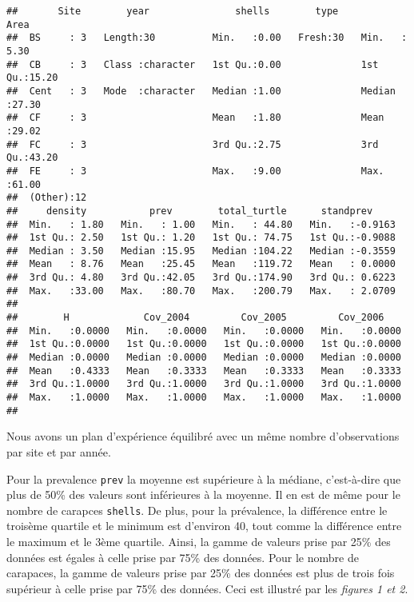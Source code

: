 \documentclass[
]{article}
\begin{document}
\begin{verbatim}
##       Site        year               shells        type         Area      
##  BS     : 3   Length:30          Min.   :0.00   Fresh:30   Min.   : 5.30  
##  CB     : 3   Class :character   1st Qu.:0.00              1st Qu.:15.20  
##  Cent   : 3   Mode  :character   Median :1.00              Median :27.30  
##  CF     : 3                      Mean   :1.80              Mean   :29.02  
##  FC     : 3                      3rd Qu.:2.75              3rd Qu.:43.20  
##  FE     : 3                      Max.   :9.00              Max.   :61.00  
##  (Other):12                                                               
##     density           prev        total_turtle      standprev      
##  Min.   : 1.80   Min.   : 1.00   Min.   : 44.80   Min.   :-0.9163  
##  1st Qu.: 2.50   1st Qu.: 1.20   1st Qu.: 74.75   1st Qu.:-0.9088  
##  Median : 3.50   Median :15.95   Median :104.22   Median :-0.3559  
##  Mean   : 8.76   Mean   :25.45   Mean   :119.72   Mean   : 0.0000  
##  3rd Qu.: 4.80   3rd Qu.:42.05   3rd Qu.:174.90   3rd Qu.: 0.6223  
##  Max.   :33.00   Max.   :80.70   Max.   :200.79   Max.   : 2.0709  
##                                                                    
##        H             Cov_2004         Cov_2005         Cov_2006     
##  Min.   :0.0000   Min.   :0.0000   Min.   :0.0000   Min.   :0.0000  
##  1st Qu.:0.0000   1st Qu.:0.0000   1st Qu.:0.0000   1st Qu.:0.0000  
##  Median :0.0000   Median :0.0000   Median :0.0000   Median :0.0000  
##  Mean   :0.4333   Mean   :0.3333   Mean   :0.3333   Mean   :0.3333  
##  3rd Qu.:1.0000   3rd Qu.:1.0000   3rd Qu.:1.0000   3rd Qu.:1.0000  
##  Max.   :1.0000   Max.   :1.0000   Max.   :1.0000   Max.   :1.0000  
## 
\end{verbatim}

Nous avons un plan d'expérience équilibré avec un même nombre
d'observations par site et par année.\newline 

Pour la prevalence \texttt{prev} la moyenne est supérieure à la médiane,
c'est-à-dire que plus de 50\% des valeurs sont inférieures à la moyenne.
Il en est de même pour le nombre de carapces \texttt{shells}. De plus,
pour la prévalence, la différence entre le troisème quartile et le
minimum est d'environ 40, tout comme la différence entre le maximum et
le 3ème quartile. Ainsi, la gamme de valeurs prise par 25\% des données
est égales à celle prise par 75\% des données. Pour le nombre de
carapaces, la gamme de valeurs prise par 25\% des données est plus de
trois fois supérieur à celle prise par 75\% des données. Ceci est
illustré par les \emph{figures 1 et 2}.
\end{document}
